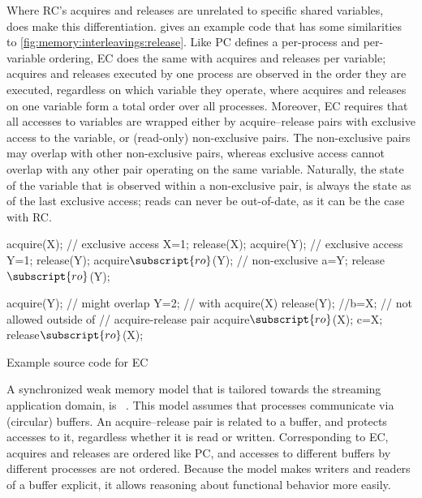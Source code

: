 Where \ac{RC}'s acquires and releases are unrelated to specific shared variables, ~\cite{bershad:midway} does make this differentiation.
 gives an example code that has some similarities to \cref{fig:memory:interleavings:release}.
Like \ac{PC} defines a per-process and per-variable ordering, \ac{EC} does the same with acquires and releases per variable; acquires and releases executed by one process are observed in the order they are executed, regardless on which variable they operate, where acquires and releases on one variable form a total order over all processes.
Moreover, \ac{EC} requires that all accesses to variables are wrapped either by acquire--release pairs with exclusive access to the variable, or (read-only) non-exclusive pairs.
The non-exclusive pairs may overlap with other non-exclusive pairs, whereas exclusive access cannot overlap with any other pair operating on the same variable.
Naturally, the state of the variable that is observed within a non-exclusive pair, is always the state as of the last exclusive access; reads can never be out-of-date, as it can be the case with \ac{RC}.

\begin{parcodes}%
\begin{parcol}{.45\linewidth}%
\begin{parcode}{\linewidth}%
\begin{lstcode}[variable={X,Y,a}]
acquire(X); // exclusive access
X=1;
release(X);
acquire(Y); // exclusive access
Y=1;
release(Y);
acquire$\subscript{ro}$(Y); // non-exclusive
a=Y;
release$\subscript{ro}$(Y);
\end{lstcode}%
\end{parcode}%
\end{parcol}%
\begin{parcol}{.45\linewidth}%
\begin{parcode}{\linewidth}%
\begin{lstcode}[variable={X,Y,b,c}]
acquire(Y); // might overlap
Y=2;        //  with acquire(X)
release(Y);
//b=X; // not allowed outside of
       //  acquire-release pair
acquire$\subscript{ro}$(X);
c=X;
release$\subscript{ro}$(X);
\end{lstcode}%
\end{parcode}%
\end{parcol}%
\caption{Example source code for \acl{EC}}%
\label{fig:memory:interleavings:entry}%
\end{parcodes}

A synchronized weak memory model that is tailored towards the streaming application domain, is ~\cite{brand:streaming_consistency}.
This model assumes that processes communicate via (circular) buffers.
An acquire--release pair is related to a buffer, and protects accesses to it, regardless whether it is read or written.
Corresponding to \ac{EC}, acquires and releases are ordered like \ac{PC}, and accesses to different buffers by different processes are not ordered.
Because the model makes writers and readers of a buffer explicit, it allows reasoning about functional behavior more easily.

